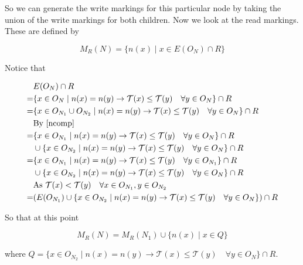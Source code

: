 \documentclass[twoside,a4paper]{report}
\begin{document}
So we can generate the write markings for this particular node by taking the union of the write markings for both children. Now we look at the read
markings. These are defined by

$$M_R(N) = \{n(x) \mid x \in E(O_N) \cap R \}$$

Notice that

\begin{align*}
& E(O_N) \cap R \\
=& \{x \in O_N \mid n(x) = n(y) \rightarrow \mathcal{T}(x) \le \mathcal{T}(y) \quad \forall y \in O_N \} \cap R \\
=& \{x \in O_{N_1} \cup O_{N_2} \mid n(x) = n(y) \rightarrow \mathcal{T}(x) \le \mathcal{T}(y) \quad \forall y \in O_N \} \cap R\\
& \text{By \eqref{ncomp}} \\
=& \{x \in O_{N_1} \mid n(x) = n(y) \rightarrow \mathcal{T}(x) \le \mathcal{T}(y) \quad \forall y \in O_N \} \cap R \\
& \cup \{x \in O_{N_2} \mid n(x) = n(y) \rightarrow \mathcal{T}(x) \le \mathcal{T}(y) \quad \forall y \in O_N \} \cap R \\
=& \{x \in O_{N_1} \mid n(x) = n(y) \rightarrow \mathcal{T}(x) \le \mathcal{T}(y) \quad \forall y \in O_{N_1} \} \cap R \\
& \cup \{x \in O_{N_2} \mid n(x) = n(y) \rightarrow \mathcal{T}(x) \le \mathcal{T}(y) \quad \forall y \in O_N \} \cap R \\
& \text{As $\mathcal{T}(x) < \mathcal{T}(y) \quad \forall x \in O_{N_1}, y \in O_{N_2}$} \\
=& (E(O_{N_1}) \cup \{x \in O_{N_2} \mid n(x) = n(y) \rightarrow \mathcal{T}(x) \le \mathcal{T}(y) \quad \forall y \in O_N \}) \cap R
\end{align*}

So that at this point 

$$M_R(N) = M_R(N_1) \cup \{n(x) \mid x \in Q \}$$

where $Q = \{x \in O_{N_2} \mid n(x) = n(y) \rightarrow \mathcal{T}(x) \le \mathcal{T}(y) \quad \forall y \in O_N \} \cap R$.
\end{document}
